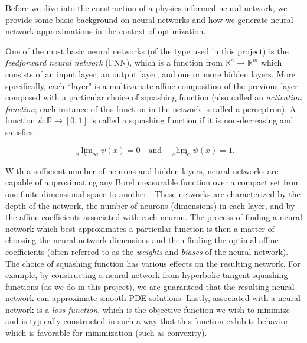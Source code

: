 Before we dive into the construction of a physics-informed neural network, we provide some basic background on neural 
networks and how we generate neural network approximations in the context of optimization.

One of the most basic neural networks (of the type used in this project) is the \textit{feedforward neural network} 
(FNN), which is a function from $\mathbb{R}^n \to \mathbb{R}^m$ which consists of an input layer, an output layer, and 
one or more hidden layers. More specifically, each ``layer" is a multivariate affine composition of the previous layer 
composed with a particular choice of squashing function (also called an \textit{activation function}; each instance of 
this function in the network is called a  perceptron). A function $\psi: \mathbb{R} \to [0, 1]$ is called a 
squashing function if it is non-decreasing and satisfies

$$
\lim\limits_{x \to -\infty} \psi(x) = 0 \quad \text{and} \quad \lim\limits_{x \to \infty} \psi(x) = 1.
$$

With a sufficient number of neurons and hidden layers, neural networks are capable of approximating any Borel measurable
function over a compact set from one finite-dimensional space to another \cite{hornik_multilayer_1989}. These networks 
are characterized by the depth of the network, the number of neurons (dimensions) in each layer, and by the affine 
coefficients associated with each neuron. The process of finding a neural network which best approximates a particular
function is then a matter of choosing the neural network dimensions and then finding the optimal affine coefficients 
(often referred to as the \textit{weights} and \textit{biases} of the neural network). The choice of squashing function
has various effects on the resulting network. For example, by constructing a neural network from hyperbolic tangent 
squashing functions (as we do in this project), we are guaranteed that the resulting neural network can approximate 
smooth PDE solutions. Lastly, associated with a neural network is a \textit{loss function}, which is the objective 
function we wish to minimize and is typically constructed in such a way that this function exhibits behavior which is
favorable for minimization (such as convexity).